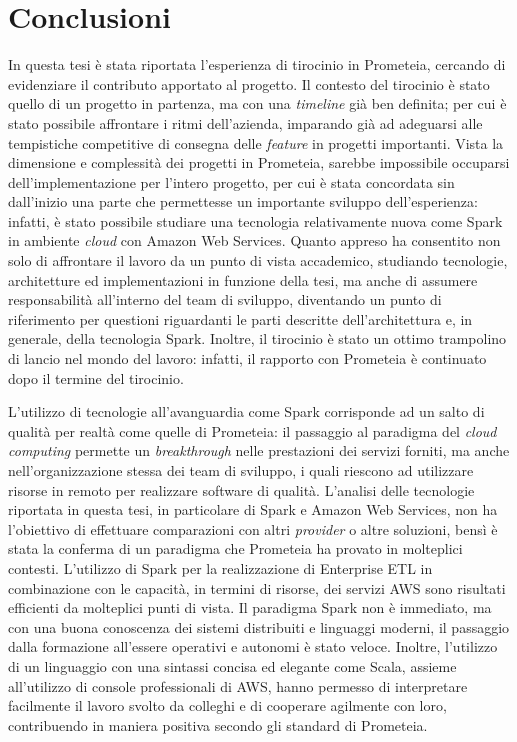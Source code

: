 \clearpage
\chapter*{Conclusioni}

In questa tesi è stata riportata l'esperienza di tirocinio in Prometeia, cercando di evidenziare il contributo apportato al progetto.
Il contesto del tirocinio è stato quello di un progetto in partenza, ma con una \textit{timeline} già ben definita;
per cui è stato possibile affrontare i ritmi dell'azienda, imparando già ad adeguarsi alle tempistiche competitive di consegna delle \textit{feature} in progetti importanti.
Vista la dimensione e complessità dei progetti in Prometeia, sarebbe impossibile occuparsi dell'implementazione per l'intero progetto, per cui è stata concordata sin dall'inizio una parte che permettesse un importante sviluppo dell'esperienza:
infatti, è stato possibile studiare una tecnologia relativamente nuova come Spark in ambiente \textit{cloud} con Amazon Web Services.
Quanto appreso ha consentito non solo di affrontare il lavoro da un punto di vista accademico, studiando tecnologie, architetture ed implementazioni in funzione della tesi, ma anche di assumere responsabilità all'interno del team di sviluppo, diventando un punto di riferimento per questioni riguardanti le parti descritte dell'architettura e, in generale, della tecnologia Spark.
Inoltre, il tirocinio è stato un ottimo trampolino di lancio nel mondo del lavoro:
infatti, il rapporto con Prometeia è continuato dopo il termine del tirocinio.

L'utilizzo di tecnologie all'avanguardia come Spark corrisponde ad un salto di qualità per realtà come quelle di Prometeia:
il passaggio al paradigma del \textit{cloud computing} permette un \textit{breakthrough} nelle prestazioni dei servizi forniti, ma anche nell'organizzazione stessa dei team di sviluppo, i quali riescono ad utilizzare risorse in remoto per realizzare software di qualità.
L'analisi delle tecnologie riportata in questa tesi, in particolare di Spark e Amazon Web Services, non ha l'obiettivo di effettuare comparazioni con altri \textit{provider} o altre soluzioni, bensì è stata la conferma di un paradigma che Prometeia ha provato in molteplici contesti.
L'utilizzo di Spark per la realizzazione di Enterprise ETL in combinazione con le capacità, in termini di risorse, dei servizi AWS sono risultati efficienti da molteplici punti di vista.
Il paradigma Spark non è immediato, ma con una buona conoscenza dei sistemi distribuiti e linguaggi moderni, il passaggio dalla formazione all'essere operativi e autonomi è stato veloce.
Inoltre, l'utilizzo di un linguaggio con una sintassi concisa ed elegante come Scala, assieme all'utilizzo di console professionali di AWS, hanno permesso di interpretare facilmente il lavoro svolto da colleghi e di cooperare agilmente con loro, contribuendo in maniera positiva secondo gli standard di Prometeia.

